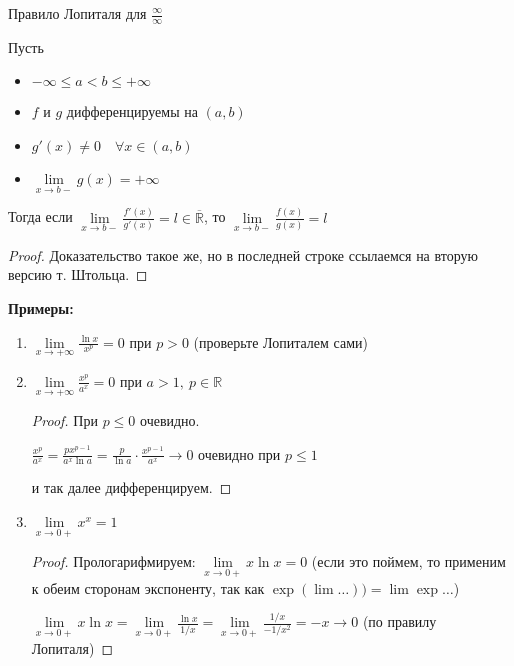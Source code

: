 \begin{theorem-non}
    Правило Лопиталя для $\frac{\infty}{\infty}$

    Пусть 
    \begin{itemize}
        \item $-\infty \leq a < b \leq +\infty$
        \item $f$ и $g$ дифференцируемы на $(a, b)$
        \item $g'(x) \neq 0 \quad \forall x \in (a, b)$
        \item $\lim\limits_{x \rightarrow b-} g(x) = +\infty$
    \end{itemize}
    Тогда если $\lim\limits_{x \rightarrow b-}\frac{f'(x)}{g'(x)} = l \in \overline{\mathbb{R}}$, 
    то $\lim\limits_{x \rightarrow b-}\frac{f(x)}{g(x)} = l$

\end{theorem-non}
\begin{proof}
    Доказательство такое же, но в последней строке ссылаемся на вторую версию т. Штольца. 
\end{proof}

\textbf{Примеры:}

\begin{enumerate}
    \item $\lim\limits_{x \rightarrow +\infty} \frac{\ln x}{x^p} = 0$ при $p > 0$ (проверьте Лопиталем сами)
    \item $\lim\limits_{x \rightarrow +\infty} \frac{x^p}{a^x} = 0$ при $a > 1, \ p \in \mathbb{R}$
    \begin{proof}
        При $p \leqslant 0$ очевидно.

        $\frac{x^p}{a^x} = \frac{px^{p-1}}{a^x \ln a} = \frac{p}{\ln a} \cdot \frac{x^{p-1}}{a^x} \longrightarrow 0$ очевидно при $p \leqslant 1$

        и так далее дифференцируем.
    \end{proof}
    \item $\lim\limits_{x \rightarrow 0+} x^x = 1$
    \begin{proof}
        Прологарифмируем: $\lim\limits_{x \rightarrow 0+} x \ln x = 0$ 
        (если это поймем, то применим к обеим сторонам экспоненту, так как $\exp(\lim \dots)) = \lim \exp \dots$)

        $\lim\limits_{x \rightarrow 0+} x \ln x = \lim\limits_{x \rightarrow 0+} \frac{\ln x}{1/x} = \lim\limits_{x \rightarrow 0+} \frac{1/x}{-1/x^2} = -x \longrightarrow 0$ (по правилу Лопиталя)
    \end{proof}
\end{enumerate}

